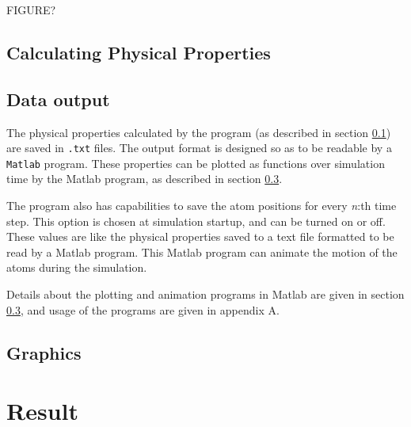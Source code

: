 \documentclass[12pt,a4paper]{article}
\begin{document}
FIGURE?


\subsection{Calculating Physical Properties}
\label{sec:calculating_physical_properties}

\subsection{Data output}
\label{sec:data_output}
The physical properties calculated by the program (as described in section \ref{sec:calculating_physical_properties}) are saved in \texttt{.txt} files. The output format is designed so as to be readable by a \texttt{Matlab} program. These properties can be plotted as functions over simulation time by the Matlab program, as described in section \ref{sec:graphics}. 

The program also has capabilities to save the atom positions for every \emph{n}:th time step. This option is chosen at simulation startup, and can be turned on or off. These values are like the physical properties saved to a text file formatted to be read by a Matlab program. This Matlab program can animate the motion of the atoms during the simulation. 

Details about the plotting and animation programs in Matlab are given in section \ref{sec:graphics}, and usage of the programs are given in appendix A.

\subsection{Graphics}
\label{sec:graphics}


\newpage
\section{Result}
\label{sec:Result}
\end{document}

